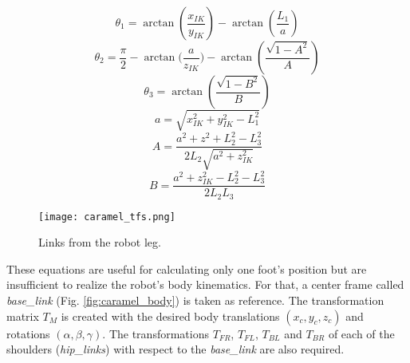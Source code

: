 \documentclass[conference]{IEEEtran}
\begin{document}
\begin{equation}
  \label{eq:theta1}
  \theta_1 = \arctan{(\frac{x_{IK}}{y_{IK}})} - \arctan{(\frac{L_1}{a})}
\end{equation}
\begin{equation}
  \label{eq:theta2}
  \theta_2 = \frac{\pi}{2} - \arctan{(\frac{a}{z_{IK}}}) - \arctan{(\frac{\sqrt{1-A^2}}{A})}
\end{equation}
\begin{equation}
  \label{eq:theta3}
  \theta_3 = \arctan(\frac{\sqrt{1-B^2}}{B})
\end{equation}
\begin{equation}
  \label{eq:a}
  a = \sqrt{x_{IK}^2+y_{IK}^2-L_1^2}
\end{equation}
\begin{equation}
  \label{eq:A}
  A =\frac{a^2+z^2+L_2^2-L_3^2}{2L_2\sqrt{a^2+z_{IK}^2}}
\end{equation}
\begin{equation}
  \label{eq:B}
  B = \frac{a^2+z_{IK}^2-L_2^2-L_3^2}{2L_2L_3}
\end{equation}

\begin{figure}[htbp]
  \centering
  \texttt{[image: caramel\_tfs.png]}
  
  \caption{Links from the robot leg.}
  \label{fig:caramel_tfs}
\end{figure}

These equations are useful for calculating only one foot's position but are insufficient to realize the robot's body kinematics. For that, a center frame called \textit{base\_link} (Fig. \ref{fig:caramel_body}) is taken as reference. The transformation matrix $T_M$ is created with the desired body translations $(x_c, y_c, z_c)$ and rotations $(\alpha, \beta, \gamma)$. The transformations $T_{FR}$, $T_{FL}$, $T_{BL}$ and $T_{BR}$ of each of the shoulders (\textit{hip\_links}) with respect to the \textit{base\_link} are also required.
\end{document}
